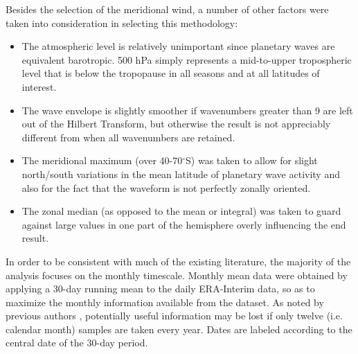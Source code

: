 Besides the selection of the meridional wind, a number of other factors were taken into consideration in selecting this methodology:
\begin{itemize}
\item The atmospheric level is relatively unimportant since planetary waves are equivalent barotropic. 500 hPa simply represents a mid-to-upper tropospheric level that is below the tropopause in all seasons and at all latitudes of interest.
\item The wave envelope is slightly smoother if wavenumbers greater than 9 are left out of the Hilbert Transform, but otherwise the result is not appreciably different from when all wavenumbers are retained.
\item The meridional maximum (over 40-70$^{\circ}$S) was taken to allow for slight north/south variations in the mean latitude of planetary wave activity and also for the fact that the waveform is not perfectly zonally oriented. 
\item The zonal median (as opposed to the mean or integral) was taken to guard against large values in one part of the hemisphere overly influencing the end result.
\end{itemize}

In order to be consistent with much of the existing literature, the majority of the analysis focuses on the monthly timescale. Monthly mean data were obtained by applying a 30-day running mean to the daily ERA-Interim data, so as to maximize the monthly information available from the dataset. As noted by previous authors \citep[e.g.][]{Kidson1988}, potentially useful information may be lost if only twelve (i.e. calendar month) samples are taken every year. Dates are labeled according to the central date of the 30-day period.   
